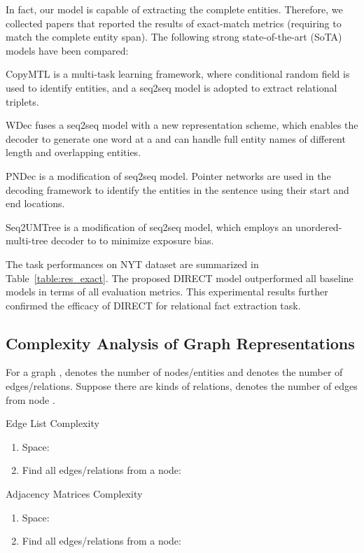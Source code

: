 \documentclass[11pt,a4paper]{article}
\begin{document}
In fact, our model is capable of extracting the complete entities. Therefore, we collected papers that reported the results of exact-match metrics (requiring to match the complete entity span). The following strong state-of-the-art (SoTA) models have been compared: 

 CopyMTL \cite{zeng2020copymtl} is a multi-task learning framework, where conditional random ﬁeld is used to identify entities, and a seq2seq model is adopted to extract relational triplets.

 WDec \cite{nayak2020effective} fuses a seq2seq model with a new representation scheme, which enables the decoder to generate one word at a and can handle full entity names of different length and overlapping entities.

 PNDec \cite{nayak2020effective} is a modiﬁcation of seq2seq model. Pointer networks are used in the decoding framework to identify the entities in the sentence using their start and end locations.

 Seq2UMTree \cite{zhang2020minimize} is a modiﬁcation of seq2seq model, which employs an unordered-multi-tree decoder to to minimize exposure bias.

The task performances on NYT dataset are summarized in Table~\ref{table:res_exact}. The proposed DIRECT model outperformed all baseline models in terms of all evaluation metrics. This experimental results further confirmed the efficacy of DIRECT for relational fact extraction task. 

\subsection{Complexity Analysis of Graph Representations}\label{ass:cagr}
For a graph ,  denotes the number of nodes/entities and  denotes the number of edges/relations. Suppose there are  kinds of relations,  denotes the number of edges from node .

  Edge List Complexity
    \begin{enumerate}
    	\item[] Space: 
        \item[] Find all edges/relations from a node: 
    \end{enumerate}
    
  Adjacency Matrices Complexity
    \begin{enumerate}
    	\item[] Space: 
        \item[] Find all edges/relations from a node: 
    \end{enumerate}
\end{document}
